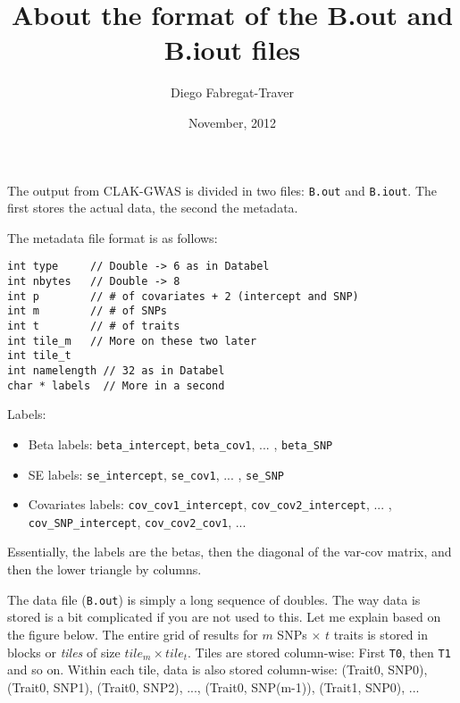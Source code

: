 \documentclass[a4paper,10pt]{article}
\begin{document}
\title{About the format of the B.out and B.iout files}

\author{Diego Fabregat-Traver}

\date{November, 2012}

\maketitle

The output from CLAK-GWAS is divided in two files: {\tt B.out} and {\tt B.iout}.
The first stores the actual data, the second the metadata.

\vspace{3mm}
\noindent
The metadata file format is as follows:

\begin{verbatim}
int type     // Double -> 6 as in Databel
int nbytes   // Double -> 8
int p        // # of covariates + 2 (intercept and SNP)
int m        // # of SNPs
int t        // # of traits
int tile_m   // More on these two later
int tile_t
int namelength // 32 as in Databel
char * labels  // More in a second
\end{verbatim}

\vspace{3mm}
\noindent
Labels:

\begin{itemize}
	\item Beta labels: {\tt beta\_intercept}, {\tt beta\_cov1}, ... , {\tt beta\_SNP}
	\item SE labels: {\tt se\_intercept}, {\tt se\_cov1}, ... , {\tt se\_SNP}
	\item Covariates labels: {\tt cov\_cov1\_intercept}, {\tt cov\_cov2\_intercept}, ... , {\tt cov\_SNP\_intercept}, {\tt cov\_cov2\_cov1}, ...
\end{itemize}

\vspace{3mm}
\noindent
Essentially, the labels are the betas, then the diagonal of the var-cov matrix, and then the lower triangle by columns.


\vspace{3mm}
\noindent
The data file ({\tt B.out}) is simply a long sequence of doubles. 
The way data is stored is a bit complicated if you are not used to this. Let me explain
based on the figure below.
The entire grid of results for $m$ SNPs $\times$ $t$ traits is stored in blocks or {\em tiles} of size
$tile_m \times tile_t$. Tiles are stored column-wise: First {\tt T0}, then {\tt T1} and so on.
Within each tile, data is also stored column-wise: (Trait0, SNP0), (Trait0, SNP1), (Trait0, SNP2), ..., (Trait0, SNP(m-1)), (Trait1, SNP0), ...
\end{document}
